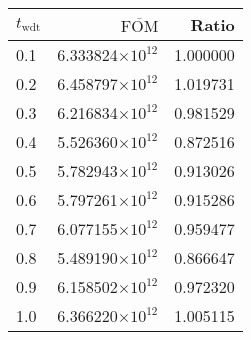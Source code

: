 \begin{tabular}{lrr}
\toprule
$t_{\mathrm{wdt}}$ & $\overline{\mathrm{FOM}}$ &    Ratio \\
\midrule
               0.1 &  6.333824$\times 10^{12}$ & 1.000000 \\
               0.2 &  6.458797$\times 10^{12}$ & 1.019731 \\
               0.3 &  6.216834$\times 10^{12}$ & 0.981529 \\
               0.4 &  5.526360$\times 10^{12}$ & 0.872516 \\
               0.5 &  5.782943$\times 10^{12}$ & 0.913026 \\
               0.6 &  5.797261$\times 10^{12}$ & 0.915286 \\
               0.7 &  6.077155$\times 10^{12}$ & 0.959477 \\
               0.8 &  5.489190$\times 10^{12}$ & 0.866647 \\
               0.9 &  6.158502$\times 10^{12}$ & 0.972320 \\
               1.0 &  6.366220$\times 10^{12}$ & 1.005115 \\
\bottomrule
\end{tabular}
